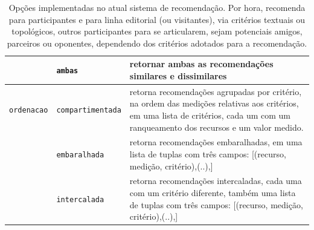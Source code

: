 \documentclass[12pt]{article}
\begin{document}
\begin{table}
\begin{center}
\begin{tabular}{|l|l|p{10cm}|}
                       & \texttt{ambas}    & retornar ambas as recomendações similares e dissimilares                      \\\hline
\texttt{ordenacao}     & \texttt{compartimentada} & retorna recomendações agrupadas por critério, na ordem das medições relativas aos critérios, em uma lista de critérios, cada um com um ranqueamento dos recursos e um valor medido. \\
                       & \texttt{embaralhada}    & retorna recomendações embaralhadas, em uma lista de tuplas com três campos: [(recurso, medição, critério),(..),]                \\
                       & \texttt{intercalada}    & {\raggedright retorna recomendações intercaladas, cada uma com um critério diferente, também uma lista de tuplas com três campos:  [(recurso, medição, critério),(..),]       }        \\\hline
\end{tabular}
\caption[Table caption text]{Opções implementadas no atual sistema de recomendação. Por hora, recomenda para participantes e para linha editorial (ou visitantes), via critérios textuais ou topológicos, outros participantes para se articularem, sejam potenciais amigos, parceiros ou oponentes, dependendo dos critérios adotados para a recomendação.}
\label{tab:srCampos}
\end{center}
\end{table}
\end{document}
